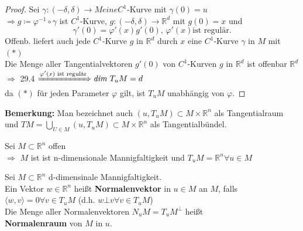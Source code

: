 \begin{proof}
Sei $\gamma: (-\delta, \delta) \rightarrow M eine C^1$-Kurve mit $\gamma(0) = u $ \\
$\Rightarrow g \coloneqq \varphi^{-1} \circ \gamma $ ist $C^1$-Kurve, 
$g: (-\delta, \delta) \rightarrow \mathbb{R}^d $ mit $ g(0) = x $ und
    \begin{equation*}
    \gamma' (0) = \varphi' (x) g'(0) \text{, } \varphi' (x) \text{ist regulär.}
    \tag{$\ast$}
    \end{equation*}
Offenb. liefert auch jede $C^1$-Kurve $g$ in $\mathbb{R}^d $ durch $x$
eine $C^1$-Kurve $\gamma$ in $M$ mit $(\ast)$ \\
Die Menge aller Tangentialvektoren $g'(0)$ von $C^1$-Kurven $g$ in $\mathbb{R}^d $
ist offenbar $\mathbb{R}^d $ \\
$\Rightarrow $ 
29.4 $ \xRightarrow{\varphi' (x) \text{ ist regulär}} \textit{dim } T_uM = d $ \\
da $(\ast)$ für jeden Parameter $\varphi$ gilt, ist $T_uM$ unabhängig von $\varphi$.
\end{proof}

\textbf{Bemerkung:}
Man bezeichnet auch $(u, T_uM) \subset M \times \mathbb{R}^n$
als Tangentialraum und
$TM = \bigcup\limits_{U \in M} (u, T_uM) \subset M \times \mathbb{R}^n $
als Tangentialbündel.

\begin{beispiel}
Sei $M \subset \mathbb{R}^n $ offen  \\
$\Rightarrow $ $M$ ist ist n-dimensionale Mannigfaltigkeit und 
$T_uM = \mathbb{R}^n \forall u \in M $
\end{beispiel}

\begin{definition}
Sei $M \subset \mathbb{R}^n $ d-dimensinale Mannigfaltigkeit. \\
Ein Vektor $w \in \mathbb{R}^n $ heißt \textbf{Normalenvektor} in $u \in M $ an $M$, falls\\
$\langle w,v \rangle = 0 \forall v \in T_uM $
(d.h. $w \bot v \forall v \in T_uM$) \\
Die Menge aller Normalenvektoren $N_uM = T_uM^{\bot} $ heißt \\
\textbf{Normalenraum} von $M$ in $u$. 
\end{definition}